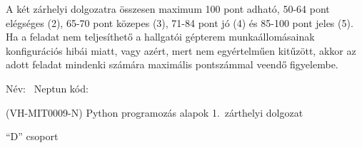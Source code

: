 \documentclass[a4paper,12pt]{letter}
\begin{document}
A két zárhelyi dolgozatra összesen maximum 100 pont adható, 50-64 pont elégséges (2), 65-70 pont közepes (3), 71-84 pont jó (4) és 85-100 pont jeles (5). Ha a feladat nem teljesíthető a hallgatói gépterem munkaállomásainak konfigurációs hibái miatt, vagy azért, mert nem egyértelműen kitűzött, akkor az adott feladat mindenki számára maximális pontszámmal veendő figyelembe.

\bigskip


\vfill

\newpage

Név: \hrulefill\ Neptun kód: \hrulefill

\begin{center}
 (VH-MIT0009-N) Python programozás alapok 1.~zárthelyi dolgozat

 ``D'' csoport
 \end{center}
\end{document}
